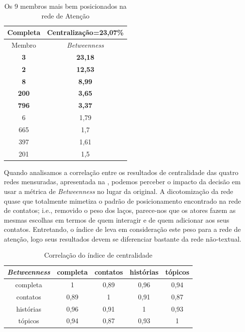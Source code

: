 \begin{table}[htbp]
	\setlength{\arrayrulewidth}{2\arrayrulewidth}  %
	\setlength{\belowcaptionskip}{10pt}  %
	\caption{Os 9 membros mais bem posicionados na rede de Atenção} \centering   
	\begin{tabular}{| c | c |}
	\hline
	Completa & Centralização=23,07\% \\ \hline\hline
	Membro & \emph{Betweenness} \\ \hline
	\textbf{3} & \textbf{23,18} \\
	\textbf{2} & \textbf{12,53} \\
	\textbf{8} & \textbf{8,99} \\
	\textbf{200} & \textbf{3,65} \\
	\textbf{796} & \textbf{3,37} \\
	6 & 1,79 \\
	665 & 1,7 \\
	397 & 1,61 \\
	201 & 1,5 \\\hline
	\end{tabular}
	\label{ap:tab:cent-completa}
\end{table}

Quando analisamos a correlação entre os resultados de centralidade das quatro
redes mensuradas, apresentada na , podemos perceber o
impacto da decisão em usar a métrica de \emph{Betweenness} no lugar da original.
A dicotomização da rede quase que totalmente mimetiza o padrão de posicionamento
encontrado na rede de contatos; i.e., removido o peso dos laços, parece-nos que
os atores fazem as mesmas escolhas em termos de quem interagir e de quem
adicionar aos seus contatos. Entretando, o índice de \citeauthor{Bonacich1987}
leva em consideração este peso para a rede de atenção, logo seus resultados
devem se diferenciar bastante da rede não-textual.

\begin{table}[htbp]
	\setlength{\arrayrulewidth}{2\arrayrulewidth}  %
	\setlength{\belowcaptionskip}{10pt}  %
	\caption{Correlação do índice de centralidade} \centering   
	\begin{tabular}{| c | c c c c|}
	\hline
	\emph{Betweenness} & completa & contatos & histórias & tópicos \\ \hline
	completa & 1 & 0,89 & 0,96 & 0,94 \\
	contatos & 0,89 & 1 & 0,91 & 0,87 \\
	histórias & 0,96 & 0,91 & 1 & 0,93 \\
	tópicos & 0,94 & 0,87 & 0,93 & 1 \\\hline
	\end{tabular}
	\label{ap:tab:cent-corr}
\end{table}

